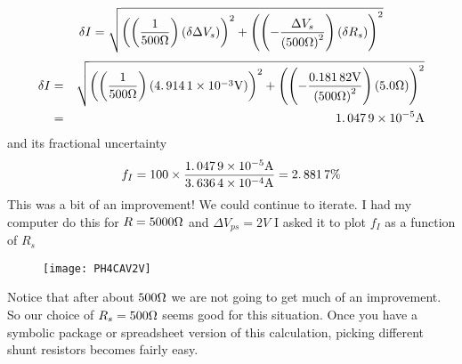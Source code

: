 \begin{equation*}
\delta I=\sqrt{\left( \left( \frac{1}{500\unit{%
\Omega%
}}\right) \left( \delta \Delta V_{s}\right) \right) ^{2}+\left( \left( -%
\frac{\Delta V_{s}}{\left( 500\unit{%
\Omega%
}\right) ^{2}}\right) \left( \delta R_{s}\right) \right) ^{2}}
\end{equation*}%
\begin{eqnarray*}
\delta I &=&\sqrt{\left( \left( \frac{1}{500\unit{%
\Omega%
}}\right) \left( 4.\,\allowbreak 914\,1\times 10^{-3}\unit{V}\right) \right)
^{2}+\left( \left( -\frac{0.181\,82\unit{V}}{\left( 500\unit{%
\Omega%
}\right) ^{2}}\right) \left( 5.0\unit{%
\Omega%
}\right) \right) ^{2}} \\
&=&1.\,\allowbreak 047\,9\times 10^{-5}\unit{A}
\end{eqnarray*}
and its fractional uncertainty%
\begin{equation*}
f_{I}=100\times \frac{1.\,\allowbreak 047\,9\times 10^{-5}\unit{A}}{%
3.\,\allowbreak 636\,4\times 10^{-4}\unit{A}}=2.\,\allowbreak 881\,7\%
\end{equation*}
This was a bit of an improvement! We could continue to iterate. I had my
computer do this for $R=5000\unit{%
\Omega%
}$ and $\Delta V_{ps}=2\unit{V}$ I asked it to plot $f_{I}$ as a function of 
$R_{s}$ \begin{figure}[h!]
\texttt{[image: PH4CAV2V]}
\end{figure}Notice that after about $500\unit{%
\Omega%
}$ we are not going to get much of an improvement. So our choice of $%
R_{s}=500\unit{%
\Omega%
}$ seems good for this situation. Once you have a symbolic package or
spreadsheet version of this calculation, picking different shunt resistors
becomes fairly easy.

